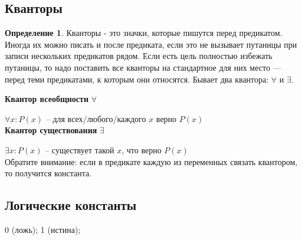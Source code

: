 \documentclass[12pt,oneside]{article}
\theoremstyle{definition}
\newtheorem{definition}{Определение}
\begin{document}
\subsection{Кванторы}

\begin{definition}
Кванторы - это значки, которые пишутся перед предикатом. Иногда их можно писать и после предиката, если это не вызывает путаницы при записи нескольких предикатов рядом. Если есть цель полностью избежать путаницы, то надо поставить все кванторы на стандартное для них место --- перед теми предикатами, к которым они относятся. Бывает два квантора: $\forall$ и $\exists$.
\end{definition}

{\bf Квантор всеобщности} $\forall$

$\forall x: P(x)$ \--- для всех/любого/каждого $x$ верно $P(x)$\\

{\bf Квантор существования} $\exists$

$\exists x: P(x)$ \--- существует такой $x$, что верно $P(x)$\\

Обратите внимание: если в предикате каждую из переменных связать квантором, то получится константа.

\subsection{Логические константы}
0 (ложь);
1 (истина);
\end{document}
